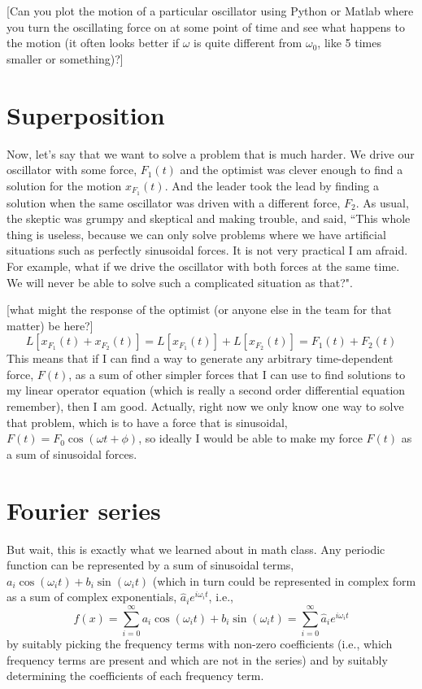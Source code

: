 \documentclass[]{revtex4}
\newcommand{\st}[1]{{\color{red}\bfseries #1}}
\begin{document}
[Can you plot the motion of a particular oscillator using Python or Matlab where you turn
  the oscillating force on at some point of time and see what happens to the motion (it
  often looks better if $\omega$ is quite different from $\omega_0$, like 5 times smaller or something)?]



\section*{Superposition}

Now, let's say that we want to solve a problem that is much harder.  We drive our oscillator
with some force, $F_1(t)$ and the optimist was clever enough to find a solution for the
motion $x_{F_1}(t)$.  And the leader took the lead by finding a solution when the same
oscillator was driven with a different force, $F_2$. As usual, the skeptic was grumpy and
skeptical and making trouble, and said, ``This whole thing is useless, because we can only
solve problems where we have artificial situations such as perfectly sinusoidal forces.  It
is not very practical I am afraid. For example, what if we drive the oscillator with both
forces at the same time.  We will never be able to solve such a complicated situation as
that?".

[what might the response of the optimist (or anyone else in the team for that matter) be here?]
\st{
  \begin{equation*}
    L[x_{F_1}(t)+x_{F_2}(t)] = L[x_{F_1}(t)] + L[x_{F_2}(t)] = F_1(t) + F_2(t)
  \end{equation*}
}
This means that if I can find a way to generate any arbitrary time-dependent force, $F(t)$,
as a sum of other simpler forces that I can use to find solutions to my linear operator
equation (which is really a second order differential equation remember), then I am good.
Actually, right now we only know one way to solve that problem, which is to have a force
that is sinusoidal, $F(t) = F_0\cos(\omega t +\phi)$, so ideally I would be able to make my
force $F(t)$ as a sum of sinusoidal forces.

\section*{Fourier series}

But wait, this is exactly what we learned about in math class.  Any periodic function can be
represented by a sum of sinusoidal terms, $a_i\cos(\omega_i t)+ b_i\sin(\omega_i t)$ (which
in turn could be represented in complex form as a sum of complex exponentials,
$\hat{a}_ie^{i\omega_i t}$, i.e.,
\st{
  \begin{equation}
    f(x) = \sum\limits_{i=0}^{\infty} a_i\cos(\omega_i t)+ b_i\sin(\omega_i t) = \sum\limits_{i=0}^{\infty} \hat{a}_ie^{i\omega_i t}
  \end{equation}
}
by suitably picking the frequency terms with non-zero coefficients (i.e., which frequency
terms are present and which are not in the series) and by suitably determining the
coefficients of each frequency term.
\end{document}
